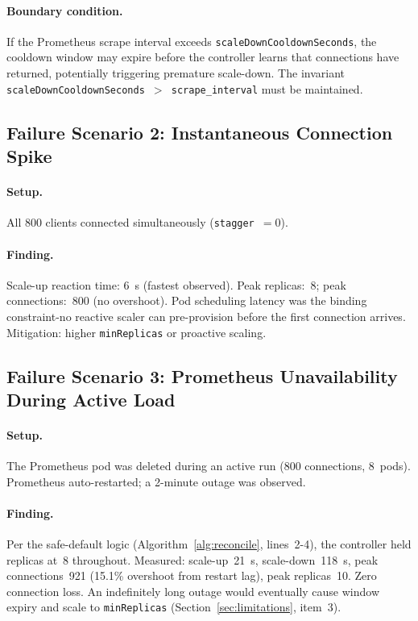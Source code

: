 \documentclass[3p,twocolumn]{elsarticle}
\theoremstyle{plain}%
\theoremstyle{definition}%
\begin{document}
\paragraph{Boundary condition.} If the Prometheus scrape interval exceeds
\texttt{scaleDownCooldownSeconds}, the cooldown window may expire before the controller
learns that connections have returned, potentially triggering premature scale-down. The
invariant \texttt{scaleDownCooldownSeconds $>$ scrape\_interval} must be maintained.

\subsection{Failure Scenario 2: Instantaneous Connection Spike}

\paragraph{Setup.} All 800 clients connected simultaneously (\texttt{stagger}~$= 0$).

\paragraph{Finding.} Scale-up reaction time: 6~s (fastest observed). Peak replicas:~8; peak connections:~800 (no overshoot). Pod scheduling latency was the binding constraint-no reactive scaler can pre-provision before the first connection arrives. Mitigation: higher \texttt{minReplicas} or proactive scaling.

\subsection{Failure Scenario 3: Prometheus Unavailability During Active Load}

\paragraph{Setup.} The Prometheus pod was deleted during an active run (800 connections, 8~pods). Prometheus auto-restarted; a 2-minute outage was observed.

\paragraph{Finding.} Per the safe-default logic (Algorithm~\ref{alg:reconcile}, lines~2-4), the controller held replicas at~8 throughout. Measured: scale-up~21~s, scale-down~118~s, peak connections~921 (15.1\% overshoot from restart lag), peak replicas~10. Zero connection loss. An indefinitely long outage would eventually cause window expiry and scale to \texttt{minReplicas} (Section~\ref{sec:limitations}, item~3).
\end{document}
